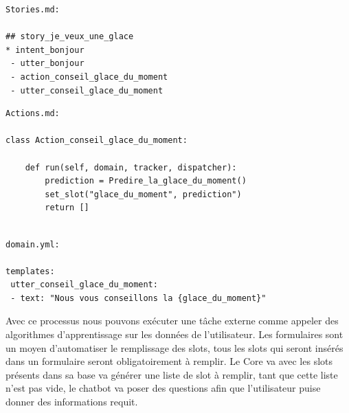 \begin{lstlisting}
Stories.md:

## story_je_veux_une_glace
* intent_bonjour
 - utter_bonjour
 - action_conseil_glace_du_moment
 - utter_conseil_glace_du_moment
\end{lstlisting}

\begin{lstlisting}
Actions.md:

class Action_conseil_glace_du_moment:

	def run(self, domain, tracker, dispatcher):
		prediction = Predire_la_glace_du_moment()
		set_slot("glace_du_moment", prediction")
		return []
		
\end{lstlisting}

\begin{lstlisting}
domain.yml:

templates:
 utter_conseil_glace_du_moment:
 - text: "Nous vous conseillons la {glace_du_moment}"
\end{lstlisting}

Avec ce processus nous pouvons exécuter une tâche externe comme appeler des algorithmes d'apprentissage sur les données de l'utilisateur.\linebreak
Les formulaires sont un moyen d'automatiser le remplissage des slots, tous les slots qui seront insérés dans un formulaire seront obligatoirement à remplir. Le Core va avec les slots présents dans sa base va générer une liste de slot à remplir, tant que cette liste n'est pas vide, le chatbot va poser des questions afin que l'utilisateur puise donner des informations requit.
